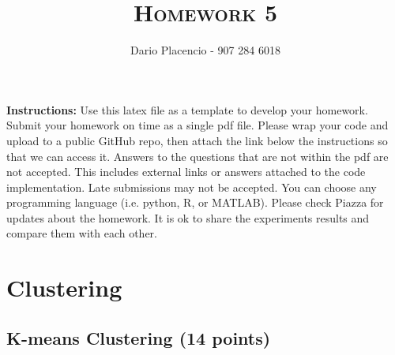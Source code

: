 \documentclass[a4paper]{article}
\title{\textsc{Homework 5}} %
\author{Dario Placencio - 907 284 6018
}
\date{}
\theoremstyle{definition}
\begin{document}
\maketitle 


\textbf{Instructions:}
Use this latex file as a template to develop your homework. Submit your homework on time as a single pdf file. Please wrap your code and upload to a public GitHub repo, then attach the link below the instructions so that we can access it. Answers to the questions that are not within the pdf are not accepted. This includes external links or answers attached to the code implementation. Late submissions may not be accepted. You can choose any programming language (i.e. python, R, or MATLAB). Please check Piazza for updates about the homework. It is ok to share the experiments results and compare them with each other.

\vspace{0.1in}


\section{Clustering}

\subsection{K-means Clustering (14 points)}
\end{document}
